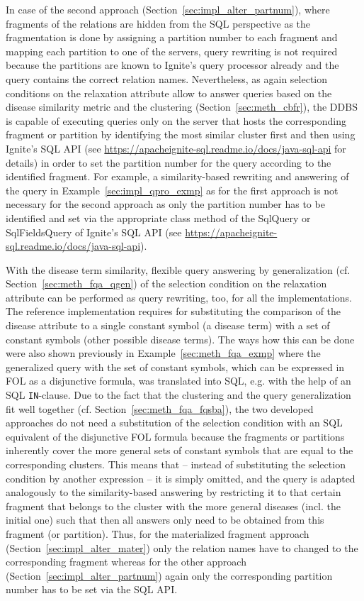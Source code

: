 In case of the second approach (Section~\ref{sec:impl_alter_partnum}), where fragments of the relations are hidden from the SQL perspective as the fragmentation
is done by assigning a partition
number to each fragment and mapping each partition to one of the servers, query rewriting is not required because the partitions are known to Ignite's query
processor already and the query contains the correct relation names. Nevertheless, as again selection conditions on the relaxation attribute allow to answer
queries based on the disease similarity metric and the clustering (Section~\ref{sec:meth_cbfr}), the DDBS is capable of executing queries only on the server 
that hosts the corresponding fragment or partition by identifying the most similar cluster first and then using Ignite's SQL API (see
\url{https://apacheignite-sql.readme.io/docs/java-sql-api} for details) in order to set the partition number for the query according to the identified 
fragment. For example, a similarity-based rewriting and answering of the query in Example~\ref{sec:impl_qpro_exmp} as for the first approach is not necessary
for the second approach as only the partition number has to be identified and set via the appropriate class method of the SqlQuery or SqlFieldsQuery of 
Ignite's SQL API (see \url{https://apacheignite-sql.readme.io/docs/java-sql-api}). 


With the disease term similarity, flexible query answering by generalization (cf. Section~\ref{sec:meth_fqa_qgen}) of the selection condition on the relaxation 
attribute can be performed
as query rewriting, too, for all the implementations. The reference implementation requires for substituting the comparison of the disease attribute to a 
single constant symbol (a disease term) with a set of constant symbols (other possible disease terms). The ways how this can be done were also shown previously 
in Example~\ref{sec:meth_fqa_exmp} where the generalized query with the set of constant symbols, which can be expressed in FOL as a disjunctive formula, was
translated into SQL, e.g. with the help of an SQL \verb!IN!-clause. Due to the fact that the clustering and the query generalization fit well together
(cf. Section~\ref{sec:meth_fqa_fqsba}), the two
developed approaches do not need a substitution of the selection condition with an SQL equivalent of the disjunctive FOL formula because the fragments or
partitions inherently cover the more general sets of constant symbols that are equal to the corresponding clusters. This means that -- instead of substituting
the selection condition by another expression -- it is simply omitted, and the query is adapted analogously to the similarity-based answering by restricting it 
to that certain fragment that belongs to the cluster with the more general diseases (incl. the initial one) such that then all answers only need to be obtained
from this fragment (or partition). Thus, for the materialized fragment approach (Section~\ref{sec:impl_alter_mater}) only the relation names have to changed to 
the corresponding fragment whereas
for the other approach (Section~\ref{sec:impl_alter_partnum}) again only the corresponding partition number has to be set via the SQL API. 


